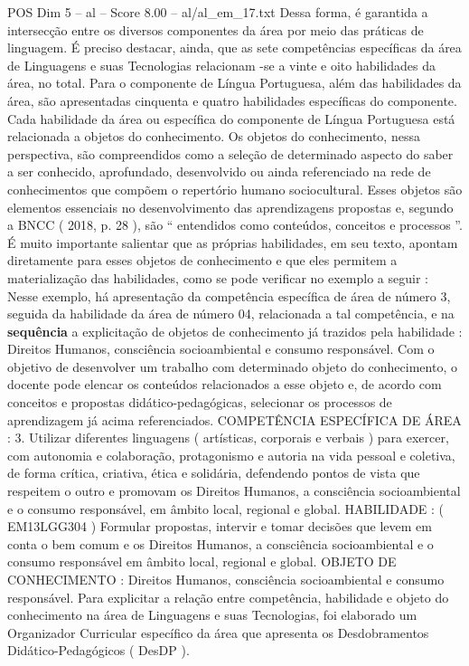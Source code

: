 \begin{textsample}{POS Dim 5 – al – Score 8.00 – al/al\_em\_17.txt}
Dessa forma, é garantida a intersecção entre os diversos componentes da área por meio das práticas de linguagem.
É preciso destacar, ainda, que as sete competências específicas da área de Linguagens e suas Tecnologias relacionam -se a vinte e oito habilidades da área, no total.
Para o componente de Língua Portuguesa, além das habilidades da área, são apresentadas cinquenta e quatro habilidades específicas do componente.
Cada habilidade da área ou específica do componente de Língua Portuguesa está relacionada a objetos do conhecimento.
Os objetos do conhecimento, nessa perspectiva, são compreendidos como a seleção de determinado aspecto do saber a ser conhecido, aprofundado, desenvolvido ou ainda referenciado na rede de conhecimentos que compõem o repertório humano sociocultural.
Esses objetos são elementos essenciais no desenvolvimento das aprendizagens propostas e, segundo a BNCC ( 2018, p. 28 ), são “ entendidos como conteúdos, conceitos e processos ”.
É muito importante salientar que as próprias habilidades, em seu texto, apontam diretamente para esses objetos de conhecimento e que eles permitem a materialização das habilidades, como se pode verificar no exemplo a seguir : Nesse exemplo, há apresentação da competência específica de área de número 3, seguida da habilidade da área de número 04, relacionada a tal competência, e na \textbf{sequência} a explicitação de objetos de conhecimento já trazidos pela habilidade : Direitos Humanos, consciência socioambiental e consumo responsável.
Com o objetivo de desenvolver um trabalho com determinado objeto do conhecimento, o docente pode elencar os conteúdos relacionados a esse objeto e, de acordo com conceitos e propostas didático-pedagógicas, selecionar os processos de aprendizagem já acima referenciados.
COMPETÊNCIA ESPECÍFICA DE ÁREA : 3.
Utilizar diferentes linguagens ( artísticas, corporais e verbais ) para exercer, com autonomia e colaboração, protagonismo e autoria na vida pessoal e coletiva, de forma crítica, criativa, ética e solidária, defendendo pontos de vista que respeitem o outro e promovam os Direitos Humanos, a consciência socioambiental e o consumo responsável, em âmbito local, regional e global.
HABILIDADE : ( EM13LGG304 ) Formular propostas, intervir e tomar decisões que levem em conta o bem comum e os Direitos Humanos, a consciência socioambiental e o consumo responsável em âmbito local, regional e global.
OBJETO DE CONHECIMENTO : Direitos Humanos, consciência socioambiental e consumo responsável.
Para explicitar a relação entre competência, habilidade e objeto do conhecimento na área de Linguagens e suas Tecnologias, foi elaborado um Organizador Curricular específico da área que apresenta os Desdobramentos Didático-Pedagógicos ( DesDP ).

\end{textsample}
